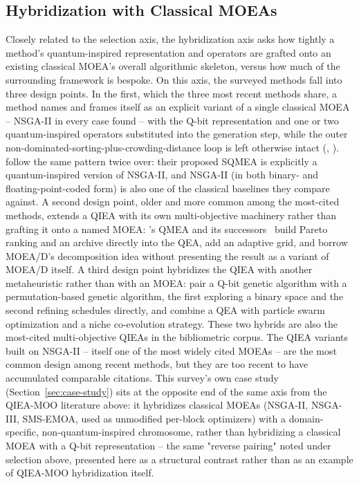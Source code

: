 \subsection{Hybridization with Classical MOEAs}
\label{sec:taxonomy:hybridization}

Closely related to the selection axis, the hybridization axis asks how
tightly a method's quantum-inspired representation and operators are
grafted onto an existing classical MOEA's overall algorithmic skeleton,
versus how much of the surrounding framework is bespoke. On this axis,
the surveyed methods fall into three design points. In the first,
which the three most recent methods share, a method names and frames
itself as an explicit variant of a single classical MOEA -- NSGA-II in
every case found -- with the Q-bit
representation and one or two
quantum-inspired operators substituted into the generation step, while
the outer non-dominated-sorting-plus-crowding-distance loop is left
otherwise intact (\citet{guzel2022qnsga2},
\citet{kumar2026eahqnsga2}). \citet{olvera2023continuous} follow the
same pattern twice over: their proposed SQMEA is explicitly a
quantum-inspired version of NSGA-II, and NSGA-II (in both binary- and
floating-point-coded form) is also one of the classical baselines they
compare against.
A second design point, older and more common among the most-cited
methods, extends a QIEA with its own multi-objective machinery rather
than grafting it onto a named MOEA: \citet{kim2006qmea}'s QMEA and its
successors~\citep{kim2009mqea,kim2011mqeaps} build Pareto ranking and an
archive directly into the QEA, \citet{zhang2012moqeavrp} add an adaptive
grid, and \citet{deng2024moqead} borrow MOEA/D's decomposition idea
without presenting the result as a variant of MOEA/D itself. A third
design point hybridizes the QIEA with another metaheuristic rather than
with an MOEA:
\citet{li2007hqga} pair a Q-bit genetic algorithm with a
permutation-based genetic algorithm, the first exploring a binary space
and the second refining schedules directly, and \citet{deng2020gate}
combine a QEA with particle swarm optimization and a niche co-evolution
strategy. These two hybrids are also the most-cited multi-objective
QIEAs in the bibliometric corpus. The QIEA variants built on
NSGA-II -- itself one of the most widely cited MOEAs -- are the most
common design among recent methods, but they are too recent to have
accumulated comparable citations. This survey's own case study
(Section~\ref{sec:case-study}) sits at the opposite end of the same
axis from the QIEA-MOO literature above: it hybridizes classical MOEAs
(NSGA-II, NSGA-III, SMS-EMOA, used as unmodified per-block optimizers)
with a domain-specific, non-quantum-inspired chromosome, rather than
hybridizing a classical MOEA with a Q-bit representation -- the same
"reverse pairing" noted under selection above, presented here as a
structural contrast rather than as an example of QIEA-MOO hybridization
itself.


